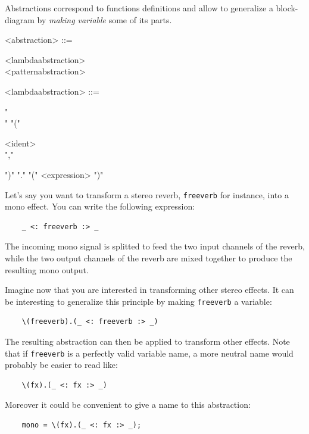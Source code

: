 \documentclass[a4paper]{book}
\begin{document}
Abstractions correspond to functions definitions and allow to generalize a block-diagram by \textit{making variable} some of its parts. 

\begin{grammar}
  <abstraction> ::= 
  \begin{syntdiag}
    \begin{stack}
      <lambdaabstraction> \\ <patternabstraction>
    \end{stack}
  \end{syntdiag}
\end{grammar}

\begin{grammar}
  <lambdaabstraction> ::= 
  \begin{syntdiag}
    "\\" "(" 
    \begin{rep}
      <ident> \\ ","
    \end{rep}
    ")" "." "(" <expression> ")"
  \end{syntdiag}
\end{grammar}

Let's say you want to transform a stereo reverb, \lstinline'freeverb' for instance, into a mono effect. You can write the following expression: 
\begin{lstlisting}
	_ <: freeverb :> _ 
\end{lstlisting}
The incoming mono signal is splitted to feed the two input channels of the reverb, while the two output channels of the reverb are mixed together to produce the resulting mono output.

Imagine now that you are interested in transforming other stereo effects. It can be interesting to generalize this principle by making \lstinline'freeverb' a variable: 
\begin{lstlisting}
	\(freeverb).(_ <: freeverb :> _)
\end{lstlisting}

The resulting abstraction can then be applied to transform other effects. Note that if \lstinline'freeverb' is a perfectly valid variable name, a more neutral name would probably be easier to read like:
\begin{lstlisting}
	\(fx).(_ <: fx :> _)
\end{lstlisting}
 
Moreover it could be convenient to give a name to this abstraction:
\begin{lstlisting}
	mono = \(fx).(_ <: fx :> _);
\end{lstlisting}
\end{document}
